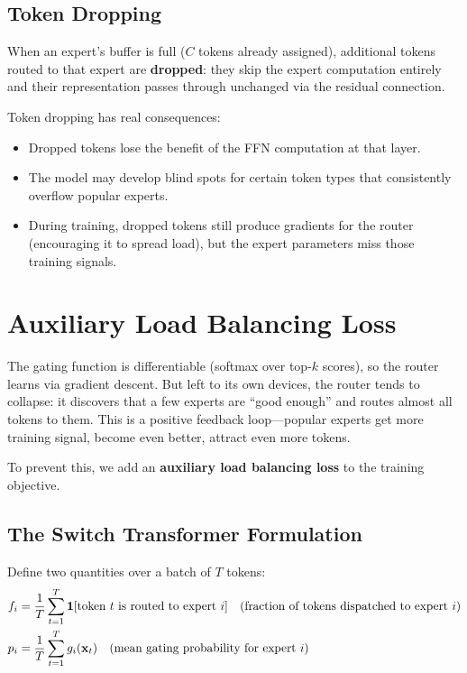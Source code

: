 \subsection{Token Dropping}

When an expert's buffer is full ($C$ tokens already assigned), additional tokens routed to that expert are \textbf{dropped}: they skip the expert computation entirely and their representation passes through unchanged via the residual connection.

Token dropping has real consequences:
\begin{itemize}
  \item Dropped tokens lose the benefit of the FFN computation at that layer.
  \item The model may develop blind spots for certain token types that consistently overflow popular experts.
  \item During training, dropped tokens still produce gradients for the router (encouraging it to spread load), but the expert parameters miss those training signals.
\end{itemize}

\section{Auxiliary Load Balancing Loss}
\label{ch:13:sec:aux_loss}

The gating function is differentiable (softmax over top-$k$ scores), so the router learns via gradient descent. But left to its own devices, the router tends to collapse: it discovers that a few experts are ``good enough'' and routes almost all tokens to them. This is a positive feedback loop---popular experts get more training signal, become even better, attract even more tokens.

To prevent this, we add an \textbf{auxiliary load balancing loss} to the training objective.

\subsection{The Switch Transformer Formulation}

Define two quantities over a batch of $T$ tokens:
\begin{align}
  f_i &= \frac{1}{T} \sum_{t=1}^{T} \mathbf{1}[\text{token } t \text{ is routed to expert } i] 
  \quad \text{(fraction of tokens dispatched to expert $i$)} \\
  p_i &= \frac{1}{T} \sum_{t=1}^{T} g_i(\mathbf{x}_t) 
  \quad \text{(mean gating probability for expert $i$)}
\end{align}

